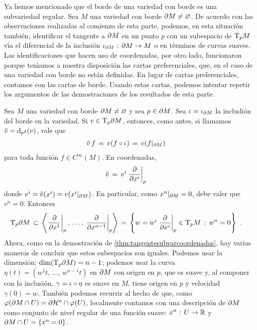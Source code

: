 Ya hemos mencionado que el borde de una variedad con borde es una
subvariedad regular. Sea $M$ una variedad con borde
$\borde[M]\not=\varnothing$. De acuerdo con las observaciones realizadas al
comienzo de esta parte, podemos, en esta situaci\'{o}n tambi\'{e}n,
identificar el tangente a $\borde[M]$ en un punto $p$ con un subespacio
de $\tangente[p]{M}$ v\'{\i}a el diferencial de la inclusi\'{o}n
$\inc[{\borde[M]}]:\,\borde[M]\rightarrow M$ o en t\'{e}rminos de curvas
suaves. Las identificaciones que hacen uso de coordenadas, por otro lado,
funcionaron porque ten\'{\i}amos a nuestra disposici\'{o}n las cartas
preferenciales, que, en el caso de una variedad con borde no est\'{a}n
definidas. En lugar de cartas preferenciales, contamos con las cartas de
borde. Usando estas cartas, podemos intentar repetir los argumentos
de las demostraciones de los resultados de esta parte.

Sea $M$ una variedad con borde $\borde[M]\not =\varnothing$ y sea
$p\in\borde[M]$. Sea $\inc=\inc[{\borde[M]}]$ la includi\'{o}n del borde
en la variedad. Si $v\in\tangente[p]{\borde[M]}$, entonces, como antes,
si llamamos $\tilde{v}=\diferencial[p]{\inc}(v)$, vale que
\begin{align*}
	\tilde{v}\,f & \,=\,v(f\circ\inc) \,=\,v(f|_{\borde[M]})
\end{align*}
%
para toda funci\'{o}n $f\in C^{\infty}(M)$. En coordenadas,
\begin{align*}
	\tilde{v} & \,=\,v^{i}\gancho[p]{x^{i}}
\end{align*}
%
donde $v^{i}=\tilde{v}(x^{i})=v(x^{i}|_{\borde[M]})$. En particular,
como $x^{n}|_{\borde[M]}=0$, debe valer que $v^{n}=0$. Entonces
\begin{align*}
	\tangente[p]{\borde[M]} & \,\subset\,
		\generado{\gancho[p]{x^{1}},\,\dots,\,\gancho[p]{x^{n-1}}}
		\,=\,\left\lbrace w=w^{i}\gancho[p]{x^{i}}\in\tangente[p]{M}
		\,:\,w^{n}=0\right\rbrace
		\text{ .}
\end{align*}
%
Ahora, como en la demostraci\'{o}n de \ref{thm:tangentesubvarcoordenadas},
hay varias maneras de concluir que estos subespacios son iguales. Podemos
usar la dimensi\'{o}n: $\dim(\tangente[p]{\borde[M]})=n-1$; podemos
usar la curva $\eta(t)=(w^{1}t,\,\dots,\,w^{n-1}t)$ en $\borde[M]$ con
origen en $p$, que es suave y, al componer con la inclusi\'{o}n,
$\gamma=\inc\circ\eta$ es suave en $M$, tiene origen en $p$ y velocidad
$\dot{\gamma}(0)=w$. Tambi\'{e}n podemos recurrir al hecho de que,
como $\varphi(\borde[M]\cap U)=\borde[{\hemi[n]}]\cap\varphi(U)$, localmente
contamos con una descripci\'{o}n de $\borde[M]$ como conjunto de nivel
regular de una funci\'{o}n suave: $x^{n}:\,U\rightarrow\bb{R}$ y
$\borde[M]\cap U=\{x^{n}=0\}$.

